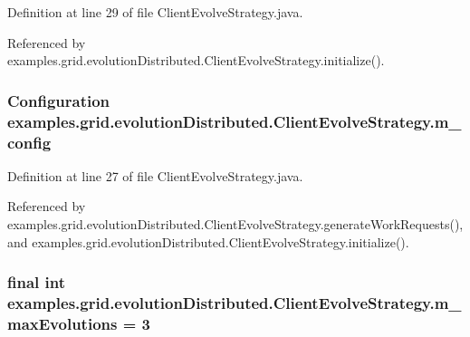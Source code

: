 Definition at line 29 of file Client\-Evolve\-Strategy.\-java.



Referenced by examples.\-grid.\-evolution\-Distributed.\-Client\-Evolve\-Strategy.\-initialize().

\hypertarget{classexamples_1_1grid_1_1evolution_distributed_1_1_client_evolve_strategy_a74d6e70dcb6fff747a2d0b90c9dbc499}{
\subsubsection[{m\-\_\-config}]{\setlength{\rightskip}{0pt plus 5cm}Configuration examples.\-grid.\-evolution\-Distributed.\-Client\-Evolve\-Strategy.\-m\-\_\-config\hspace{0.3cm}{\ttfamily [private]}}}\label{classexamples_1_1grid_1_1evolution_distributed_1_1_client_evolve_strategy_a74d6e70dcb6fff747a2d0b90c9dbc499}


Definition at line 27 of file Client\-Evolve\-Strategy.\-java.



Referenced by examples.\-grid.\-evolution\-Distributed.\-Client\-Evolve\-Strategy.\-generate\-Work\-Requests(), and examples.\-grid.\-evolution\-Distributed.\-Client\-Evolve\-Strategy.\-initialize().

\hypertarget{classexamples_1_1grid_1_1evolution_distributed_1_1_client_evolve_strategy_a0bafd8b0667b17e11a333f89afa24a96}{
\subsubsection[{m\-\_\-max\-Evolutions}]{\setlength{\rightskip}{0pt plus 5cm}final int examples.\-grid.\-evolution\-Distributed.\-Client\-Evolve\-Strategy.\-m\-\_\-max\-Evolutions = 3\hspace{0.3cm}{\ttfamily [private]}}}\label{classexamples_1_1grid_1_1evolution_distributed_1_1_client_evolve_strategy_a0bafd8b0667b17e11a333f89afa24a96}


